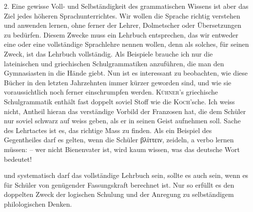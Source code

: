 2. Eine gewisse Voll- und Selbständigkeit des grammatischen Wissens ist aber das Ziel jedes höheren Sprachunterrichtes. Wir wollen die Sprache richtig \label{sp.112} verstehen und anwenden lernen, ohne ferner der Lehrer, Dolmetscher oder Übersetzungen zu bedürfen. Diesem Zwecke muss ein Lehrbuch entsprechen, das wir entweder eine  oder eine vollständige Sprachlehre nennen wollen, denn als solches, für seinen Zweck, ist das Lehrbuch vollständig. Als Beispiele brauche ich nur die lateinischen und griechischen Schulgrammatiken anzuführen, die man den Gymnasiasten in die Hände giebt. Nun ist es interessant zu beobachten, wie diese Bücher in den letzten Jahrzehnten immer kürzer geworden sind, und wie sie voraussichtlich noch ferner einschrumpfen werden. \textsc{Kühner}’s griechische Schulgrammatik enthält fast doppelt soviel Stoff wie die \textsc{Koch}’sche. Ich weiss nicht,  Antheil hieran das verständige Vorbild der Franzosen hat, die dem Schüler nur soviel schwarz auf weiss geben, als er in seinen Geist aufnehmen soll. Sache des Lehrtactes ist es, das richtige Mass zu finden. Als ein Beispiel des Gegentheiles darf es gelten, wenn die Schüler βλίττειν, zeideln, a verbo lernen müssen: – wer nicht Bienenvater ist, wird kaum wissen, was das deutsche Wort bedeutet!

 und systematisch darf das vollständige Lehrbuch sein, sollte es auch sein, wenn es für Schüler von genügender Fassungskraft berechnet ist. Nur so erfüllt es den doppelten Zweck der logischen Schulung und der Anregung zu selbständigem philologischen Denken.


